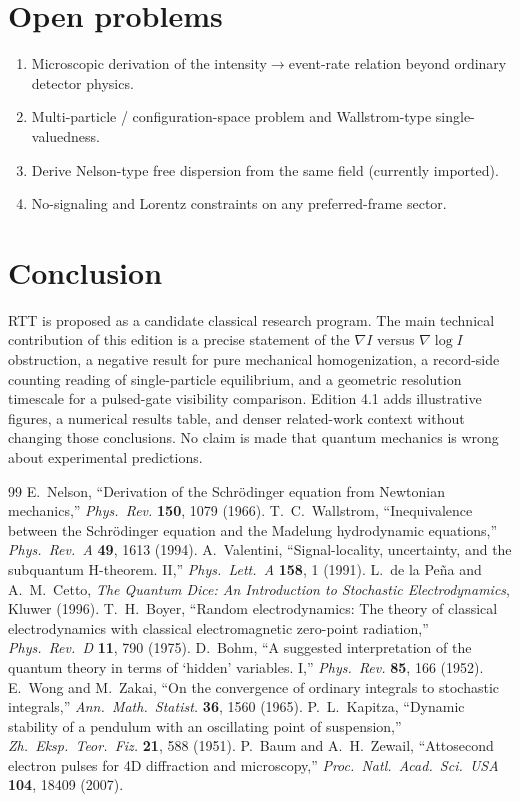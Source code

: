 \documentclass[11pt]{article}
\begin{document}
\section{Open problems}

\begin{enumerate}
\item Microscopic derivation of the intensity$\to$event-rate relation beyond ordinary detector physics.
\item Multi-particle / configuration-space problem and Wallstrom-type single-valuedness.
\item Derive Nelson-type free dispersion from the same field (currently imported).
\item No-signaling and Lorentz constraints on any preferred-frame sector.
\end{enumerate}

\section{Conclusion}

RTT is proposed as a candidate classical research program.
The main technical contribution of this edition is a precise statement of the $\nabla I$ versus $\nabla\log I$ obstruction, a negative result for pure mechanical homogenization, a record-side counting reading of single-particle equilibrium, and a geometric resolution timescale for a pulsed-gate visibility comparison.
Edition 4.1 adds illustrative figures, a numerical results table, and denser related-work context without changing those conclusions.
No claim is made that quantum mechanics is wrong about experimental predictions.

\begin{thebibliography}{99}
 E.~Nelson, ``Derivation of the Schr\"odinger equation from Newtonian mechanics,'' \emph{Phys.\ Rev.} \textbf{150}, 1079 (1966).
 T.~C.~Wallstrom, ``Inequivalence between the Schr\"odinger equation and the Madelung hydrodynamic equations,'' \emph{Phys.\ Rev.\ A} \textbf{49}, 1613 (1994).
 A.~Valentini, ``Signal-locality, uncertainty, and the subquantum H-theorem. II,'' \emph{Phys.\ Lett.\ A} \textbf{158}, 1 (1991).
 L.~de la Pe\~na and A.~M.~Cetto, \emph{The Quantum Dice: An Introduction to Stochastic Electrodynamics}, Kluwer (1996).
 T.~H.~Boyer, ``Random electrodynamics: The theory of classical electrodynamics with classical electromagnetic zero-point radiation,'' \emph{Phys.\ Rev.\ D} \textbf{11}, 790 (1975).
 D.~Bohm, ``A suggested interpretation of the quantum theory in terms of `hidden' variables. I,'' \emph{Phys.\ Rev.} \textbf{85}, 166 (1952).
 E.~Wong and M.~Zakai, ``On the convergence of ordinary integrals to stochastic integrals,'' \emph{Ann.\ Math.\ Statist.} \textbf{36}, 1560 (1965).
 P.~L.~Kapitza, ``Dynamic stability of a pendulum with an oscillating point of suspension,'' \emph{Zh.\ Eksp.\ Teor.\ Fiz.} \textbf{21}, 588 (1951).
 P.~Baum and A.~H.~Zewail, ``Attosecond electron pulses for 4D diffraction and microscopy,'' \emph{Proc.\ Natl.\ Acad.\ Sci.\ USA} \textbf{104}, 18409 (2007).
\end{thebibliography}
\end{document}
